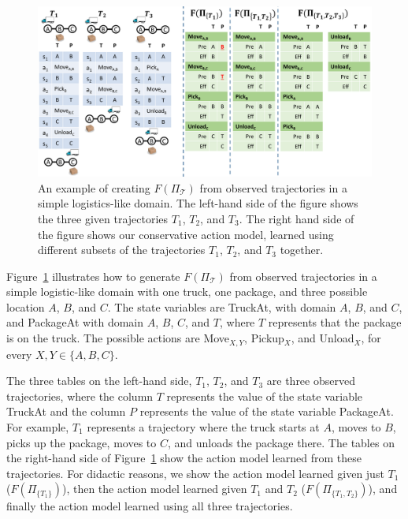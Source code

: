 \documentclass{article}
\begin{document}
	
	\begin{figure}
		\includegraphics[width=\textwidth]{example_cropped.pdf}
	\caption{An example of creating $F(\Pi_{\mathcal{T}})$ from observed trajectories in a simple logistics-like domain. The left-hand side of the figure shows the three given trajectories $T_1$, $T_2$, and $T_3$. The right hand side of the figure shows our conservative action model, 
		learned using different subsets of the trajectories $T_1$, $T_2$, and $T_3$ together.}
	\label{fig:example}
	\end{figure}
	
	
	
	Figure~\ref{fig:example} illustrates how to generate  $F(\Pi_{\mathcal{T}})$ from observed trajectories in a simple logistic-like domain with one truck, one package, and three possible location $A$, $B$, and $C$. The state variables are TruckAt, with domain $A$, $B$, and $C$, and PackageAt with domain $A$, $B$, $C$, and $T$, where $T$ represents that the package is on the truck. The possible actions are Move$_{X,Y}$, 
	Pickup$_X$, and Unload$_X$, for every $X,Y\in \{A,B,C\}$. 
	
	
	
	The three tables on the left-hand side, $T_1$, $T_2$, and $T_3$ are three observed trajectories, where the column $T$ represents the value of the state variable TruckAt and the column $P$ represents the value of the state variable PackageAt. For example, $T_1$ represents a trajectory where the truck starts at $A$, moves to $B$, picks up the package, moves to $C$, and unloads the package there. 	The tables on the right-hand side of Figure~\ref{fig:example} show the action model learned from these trajectories. For didactic reasons, we show the action model learned given just $T_1$ ($F(\Pi_{\{T_1\}})$), 
	then the action model learned given $T_1$ and $T_2$ ($F(\Pi_{\{T_1, T_2\}})$), and finally 
	the action model learned using all three trajectories. 
	
\end{document}

